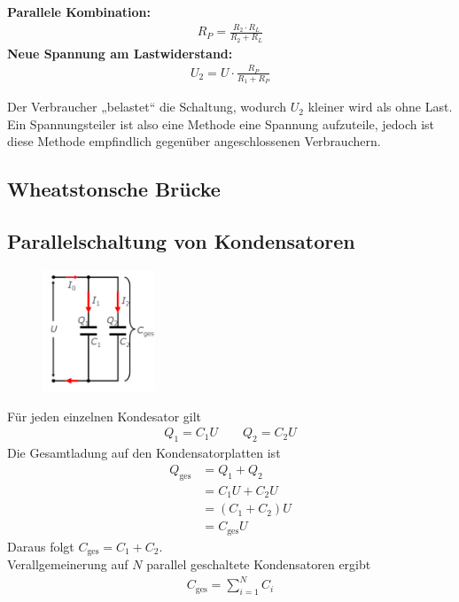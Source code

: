 \documentclass{scrartcl}
\begin{document}
\noindent \textbf{Parallele Kombination:}
\begin{align}
    R_P = \frac{R_2 \cdot R_L}{R_2 + R_L}
\end{align}
\textbf{Neue Spannung am Lastwiderstand:}
\begin{align}
    U_2 = U \cdot \frac{R_P}{R_1 + R_P}
\end{align}

\vspace{2em}
\noindent Der Verbraucher „belastet“ die Schaltung, wodurch $U_2$ kleiner wird als ohne Last.\\
Ein Spannungsteiler ist also eine Methode eine Spannung aufzuteile, jedoch ist diese Methode empfindlich gegenüber angeschlossenen Verbrauchern.

\subsection{Wheatstonsche Brücke}


\subsection{Parallelschaltung von Kondensatoren}
\begin{figure}[H]
    \centering
    \includegraphics[width=0.3\textwidth]{Parallelschaltung von Kondensatoren.png}
\end{figure}
Für jeden einzelnen Kondesator gilt
\begin{align}
    Q_1=C_1U\qquad Q_2=C_2U
\end{align}
Die Gesamtladung auf den Kondensatorplatten ist
\begin{align}
    Q_\text{ges}&=Q_1+Q_2\\
    &=C_1U+C_2U\\
    &=(C_1+C_2)U\\
    &=C_\text{ges}U
\end{align}
Daraus folgt $C_\text{ges}=C_1+C_2$.\\
Verallgemeinerung auf $N$ parallel geschaltete Kondensatoren ergibt
\begin{align}
    C_\text{ges}=\sum_{i=1}^{N}C_i
\end{align}
\end{document}
